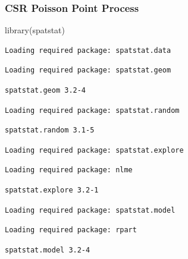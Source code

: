 \documentclass[
  letterpaper,
  DIV=11,
  numbers=noendperiod]{scrartcl}
\newenvironment{Shaded}{\begin{snugshade}}{\end{snugshade}}
\newcommand{\FunctionTok}[1]{\textcolor[rgb]{0.28,0.35,0.67}{#1}}
\newcommand{\NormalTok}[1]{\textcolor[rgb]{0.00,0.23,0.31}{#1}}
\begin{document}
\hypertarget{csr-poisson-point-process}{%
\subsubsection{CSR Poisson Point
Process}\label{csr-poisson-point-process}}

\begin{Shaded}
\begin{Highlighting}[]
\FunctionTok{library}\NormalTok{(spatstat)}
\end{Highlighting}
\end{Shaded}

\begin{verbatim}
Loading required package: spatstat.data
\end{verbatim}

\begin{verbatim}
Loading required package: spatstat.geom
\end{verbatim}

\begin{verbatim}
spatstat.geom 3.2-4
\end{verbatim}

\begin{verbatim}
Loading required package: spatstat.random
\end{verbatim}

\begin{verbatim}
spatstat.random 3.1-5
\end{verbatim}

\begin{verbatim}
Loading required package: spatstat.explore
\end{verbatim}

\begin{verbatim}
Loading required package: nlme
\end{verbatim}

\begin{verbatim}
spatstat.explore 3.2-1
\end{verbatim}

\begin{verbatim}
Loading required package: spatstat.model
\end{verbatim}

\begin{verbatim}
Loading required package: rpart
\end{verbatim}

\begin{verbatim}
spatstat.model 3.2-4
\end{verbatim}
\end{document}

